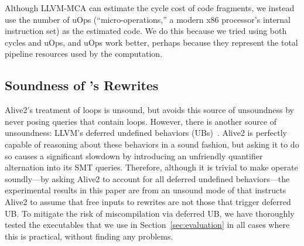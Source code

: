 Although LLVM-MCA can estimate the cycle cost of code fragments, we
instead use the number of uOps (``micro-operations,'' a modern x86
processor's internal instruction set) as the estimated code.
%
We do this because we tried using both cycles and uOps, and uOps work
better, perhaps because they represent the total pipeline resources
used by the computation.





\iffalse
\subsection{Soundness of \tool{}'s Rewrites}

Alive2's treatment of loops is unsound, but \tool{} avoids this source
of unsoundness by never posing queries that contain loops.
%
However, there is another source of unsoundness: LLVM's deferred
undefined behaviors (UBs)~\cite{alive2}.
%
Alive2 is perfectly capable of reasoning about these behaviors in a
sound fashion, but asking it to do so causes a significant slowdown by
introducing an unfriendly quantifier alternation into its SMT queries.
%
Therefore, although it is trivial to make \tool{} operate soundly---by
asking Alive2 to account for all deferred undefined behaviors---the
experimental results in this paper are from an unsound mode of \tool{}
that instructs Alive2 to assume that free inputs to rewrites are not
those that trigger deferred UB\@.
%
To mitigate the risk of miscompilation via deferred UB, we have
thoroughly tested the executables that we use in
Section~\ref{sec:evaluation} in all cases where this is practical,
without finding any problems.


